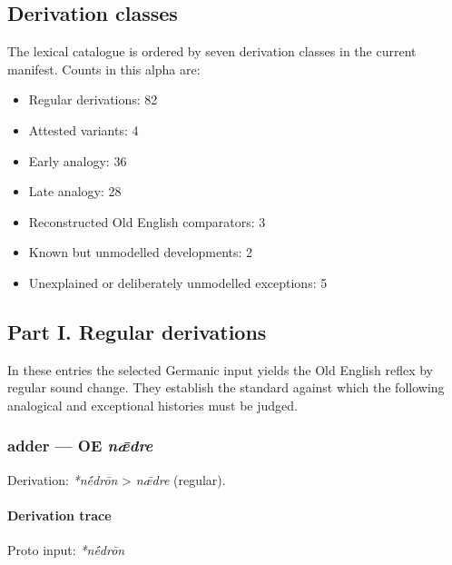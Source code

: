\documentclass[
  british,
  a4paper,
]{article}
\providecommand{\tightlist}{%
  \setlength{\itemsep}{0pt}\setlength{\parskip}{0pt}}
\begin{document}
\subsection{Derivation classes}\label{derivation-classes}

The lexical catalogue is ordered by seven derivation classes in the
current manifest. Counts in this alpha are:

\begin{itemize}
\tightlist
\item
  Regular derivations: 82
\item
  Attested variants: 4
\item
  Early analogy: 36
\item
  Late analogy: 28
\item
  Reconstructed Old English comparators: 3
\item
  Known but unmodelled developments: 2
\item
  Unexplained or deliberately unmodelled exceptions: 5
\end{itemize}

\clearpage

\subsection{Part I. Regular
derivations}\label{part-i.-regular-derivations}

In these entries the selected Germanic input yields the Old English
reflex by regular sound change. They establish the standard against
which the following analogical and exceptional histories must be judged.

\subsubsection{\texorpdfstring{adder --- OE
\emph{nǣdre}}{adder --- OE nǣdre}}\label{adder-oe-nux1e3dre}

Derivation: \emph{*nḗdrōn} \textgreater{} \emph{nǣdre} (regular).

\paragraph{Derivation trace}\label{derivation-trace}

Proto input: \emph{*nḗdrōn}

\begingroup
\setlength{\fboxsep}{6pt}
\end{document}
